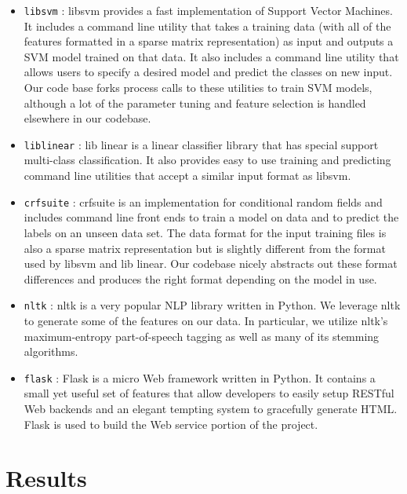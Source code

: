 \documentclass[preprint]{style}
\begin{document}
\begin{itemize}

\item {\tt libsvm} \cite{libsvm}: libsvm provides a fast implementation of Support Vector Machines. It includes a command line utility that takes a training data (with all of the features formatted in a sparse matrix representation) as input and outputs a SVM model trained on that data. It also includes a command line utility that allows users to specify a desired model and predict the classes on new input. Our code base forks process calls to these utilities to train SVM models, although a lot of the parameter tuning and feature selection is handled elsewhere in our codebase.

\item {\tt liblinear} \cite{liblinear}: lib linear is a linear classifier library that has special support multi-class classification. It also provides easy to use training and predicting command line utilities that accept a similar input format as libsvm.

\item {\tt crfsuite} \cite{crfsuite}: crfsuite is an implementation for conditional random fields and includes command line front ends to train a model on data and to predict the labels on an unseen data set. The data format for the input training files is also a sparse matrix representation but is slightly different from the format used by libsvm and lib linear. Our codebase nicely abstracts out these format differences and produces the right format depending on the model in use.

\item {\tt nltk} \cite{nltk}: nltk is a very popular NLP library written in Python. We leverage nltk to generate some of the features on our data. In particular, we utilize nltk's maximum-entropy part-of-speech tagging as well as many of its stemming algorithms.

\item {\tt flask} \cite{flask}: Flask is a micro Web framework written in Python. It contains a small yet useful set of features that allow developers to easily setup RESTful Web backends and an elegant tempting system to gracefully generate HTML. Flask is used to build the Web service portion of the project.

\end{itemize}


\section{Results}
\end{document}
